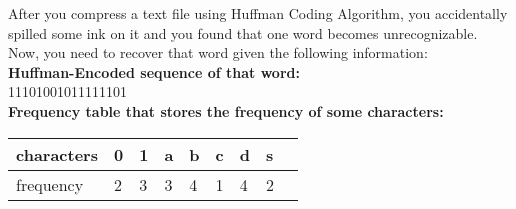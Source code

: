 
After you compress a text file using Huffman Coding Algorithm, you accidentally spilled some ink on it and you found that one word becomes unrecognizable. Now, you need to recover that word given the following information:\\

    \textbf{Huffman-Encoded sequence of that word: } \\
    11101001011111101\\
    \textbf{Frequency table that stores the frequency of some characters: }\\
    \begin{table}[!hbtp]
    \centering
    \begin{tabular}{|l|l|l|l|l|l|l|l|l|}
    \hline
    characters & 0 & 1 & a & b & c & d & s \\ \hline
    frequency  & 2 & 3 & 3 & 4 & 1 & 4 & 2 \\ \hline
    \end{tabular}
    \end{table}\\\\
